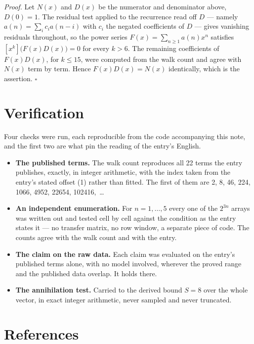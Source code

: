 \documentclass[11pt]{article}
\theoremstyle{definition}
\begin{document}
{\itshape Proof.} Let $N(x)$ and $D(x)$ be the numerator and denominator above, $D(0)=1$. The residual test applied to the recurrence read off $D$ --- namely $a(n) = \sum_i c_i a(n-i)$ with $c_i$ the negated coefficients of $D$ --- gives vanishing residuals throughout, so the power series $F(x)=\sum_{n\ge 1}a(n)x^n$ satisfies $[x^k]\bigl(F(x)D(x)\bigr) = 0$ for every $k > 6$. The remaining coefficients of $F(x)D(x)$, for $k \le 15$, were computed from the walk count and agree with $N(x)$ term by term. Hence $F(x)D(x) = N(x)$ identically, which is the assertion. $\square$

\section{Verification}

Four checks were run, each reproducible from the code accompanying this note, and the first two are what pin the reading of the entry's English.

\begin{itemize}

\item {\bfseries The published terms.} The walk count reproduces all 22 terms the entry publishes, exactly, in integer arithmetic, with the index taken from the entry's stated offset (1) rather than fitted. The first of them are 2, 8, 46, 224, 1066, 4952, 22654, 102416,~\dots

\item {\bfseries An independent enumeration.} For $n = 1,\dots,5$ every one of the $2^{3n}$ arrays was written out and tested cell by cell against the condition as the entry states it --- no transfer matrix, no row window, a separate piece of code. The counts agree with the walk count and with the entry.

\item {\bfseries The claim on the raw data.} Each claim was evaluated on the entry's published terms alone, with no model involved, wherever the proved range and the published data overlap. It holds there.

\item {\bfseries The annihilation test.} Carried to the derived bound $S = 8$ over the whole vector, in exact integer arithmetic, never sampled and never truncated.

\end{itemize}

\section{References}
\end{document}
